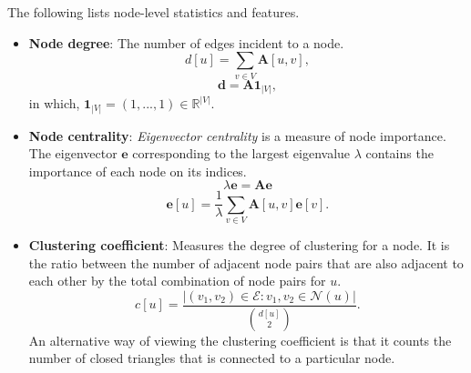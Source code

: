 \documentclass[twocolumn]{article}
\theoremstyle{plain}
\begin{document}
The following lists node-level statistics and features.
\begin{itemize}
    \item \textbf{Node degree}: The number of edges incident to a node.
        \begin{equation} \label{degree}
            d[u] = \sum_{v \in V}\textbf{A}[u,v],
        \end{equation}
        \begin{equation}
            \mathbf{d} = \mathbf{A}\mathbf{1}_{|V|},
        \end{equation}
        in which, $\mathbf{1}_{|V|} = (1,...,1) \in \mathbb{R}^{|V|}$.
    \item \textbf{Node centrality}: \textit{Eigenvector centrality} is a measure of node importance. The eigenvector $\mathbf{e}$ corresponding to the largest eigenvalue $\lambda$ contains the importance of each node on its indices.
        \begin{equation}
            \lambda \mathbf{e} = \mathbf{A}\mathbf{e}
        \end{equation}
        \begin{equation}
            \mathbf{e}[u] = \frac{1}{\lambda}\sum_{v \in V}\mathbf{A}[u,v]\mathbf{e}[v].
        \end{equation}
    \item \textbf{Clustering coefficient}: Measures the degree of clustering for a node. It is the ratio between the number of adjacent node pairs that are also adjacent to each other by the total combination of node pairs for $u$.
        \begin{equation}
            c[u] = \frac{|(v_1, v_2) \in \mathcal{E}:v_1, v_2 \in \mathcal{N}(u)|}{\binom{d[u]}{2}}.
        \end{equation}
    An alternative way of viewing the clustering coefficient is that it counts the number of closed triangles that is connected to a particular node.
\end{itemize}
\end{document}

